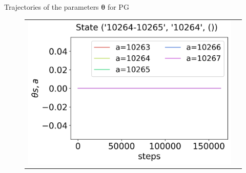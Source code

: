 \documentclass[10pt, aspectratio=169, compress, protectframetitle, handout]{beamer}
\begin{document}
\begin{frame}{Trajectories of the parameters $\boldsymbol \theta$ for PG}
\begin{figure}
\begin{tabular}{cc}
            \hspace*{-28pt}\includegraphics[scale=0.34,valign=b]{figures/theta_PG_state_3.png}
        \end{tabular}
    \end{figure}
\end{frame}
\end{document}
